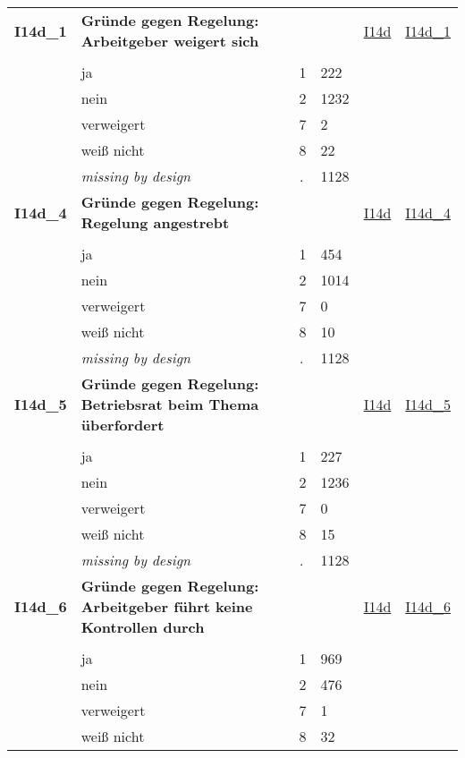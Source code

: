 \begin{longtable}{| L{2.45cm} | L{6cm} | C{1.5cm} | R{1cm} | C{2.25cm} | C{2.25cm} |}
   \midrule
\textbf{I14d\_1}\label{var:I14d:1} & \textbf{Gründe gegen Regelung: Arbeitgeber weigert sich} &  &  & \hyperref[I14d]{I14d} & \hyperref[var:suf:I14d:1]{I14d\_1} \\ 
   &  &  &  &  &  \\ 
   & ja & 1 & 222 &  &  \\ 
   & nein & 2 & 1232 &  &  \\ 
   & verweigert & 7 & 2 &  &  \\ 
   & weiß nicht & 8 & 22 &  &  \\ 
   & \textit{missing by design} & \textit{.} & 1128 &  &  \\ 
   \midrule
\textbf{I14d\_4}\label{var:I14d:4} & \textbf{Gründe gegen Regelung: Regelung angestrebt} &  &  & \hyperref[I14d]{I14d} & \hyperref[var:suf:I14d:4]{I14d\_4} \\ 
   &  &  &  &  &  \\ 
   & ja & 1 & 454 &  &  \\ 
   & nein & 2 & 1014 &  &  \\ 
   & verweigert & 7 & 0 &  &  \\ 
   & weiß nicht & 8 & 10 &  &  \\ 
   & \textit{missing by design} & \textit{.} & 1128 &  &  \\ 
   \midrule
\textbf{I14d\_5}\label{var:I14d:5} & \textbf{Gründe gegen Regelung: Betriebsrat beim Thema überfordert} &  &  & \hyperref[I14d]{I14d} & \hyperref[var:suf:I14d:5]{I14d\_5} \\ 
   &  &  &  &  &  \\ 
   & ja & 1 & 227 &  &  \\ 
   & nein & 2 & 1236 &  &  \\ 
   & verweigert & 7 & 0 &  &  \\ 
   & weiß nicht & 8 & 15 &  &  \\ 
   & \textit{missing by design} & \textit{.} & 1128 &  &  \\ 
   \midrule
\textbf{I14d\_6}\label{var:I14d:6} & \textbf{Gründe gegen Regelung: Arbeitgeber führt keine Kontrollen durch} &  &  & \hyperref[I14d]{I14d} & \hyperref[var:suf:I14d:6]{I14d\_6} \\ 
   &  &  &  &  &  \\ 
   & ja & 1 & 969 &  &  \\ 
   & nein & 2 & 476 &  &  \\ 
   & verweigert & 7 & 1 &  &  \\ 
   & weiß nicht & 8 & 32 &  &  \\ 

\end{longtable}
